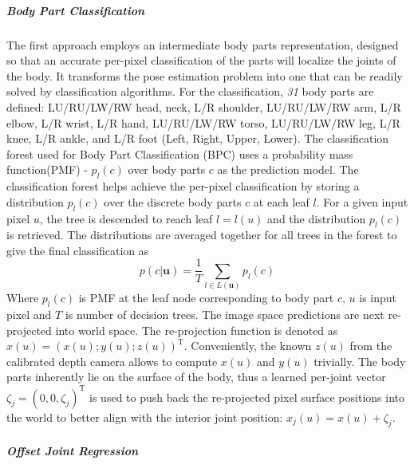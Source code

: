 \subparagraph{Body Part Classification} %
\label{subp:bpc} 
The first approach employs an intermediate body parts representation, designed so that an accurate per-pixel classification of the parts will localize the joints of the body. It transforms the pose estimation problem into one that can be readily solved by classification algorithms. For the classification, \emph{31} body parts are defined: LU/RU/LW/RW head, neck, L/R shoulder, LU/RU/LW/RW arm, L/R elbow, L/R wrist, L/R hand, LU/RU/LW/RW torso, LU/RU/LW/RW leg, L/R knee, L/R ankle, and L/R foot (Left, Right, Upper, Lower). The classification forest used for Body Part Classification (BPC) uses a probability mass function(PMF) - $p_l(c)$ over body parts $c$ as the prediction model. The classification forest helps achieve the per-pixel classification by storing a distribution $p_l(c)$ over the discrete body parts $c$ at each leaf $l$. For a given input pixel $u$, the tree is descended to reach leaf $l = l(u)$ and the distribution $p_l(c)$ is retrieved. The distributions are averaged together for all trees in the forest to give the final classification as
\begin{equation}
p(c\vert \textbf{u}) = \frac{1}{T}\sum_{l\in L(\textbf{u})} p_l(c)
\label{eqn:bpc_dist}
\end{equation}
Where $p_l(c)$ is PMF at the leaf node corresponding to body part $c$, $u$ is input pixel and $T$ is number of decision trees. The image space predictions are next re-projected into world space. The re-projection function is denoted as $x(u) = (x(u); y(u); z(u))^\text{T}$. Conveniently, the known $z(u)$ from the calibrated depth camera allows to compute $x(u)$ and $y(u)$ trivially. The body parts inherently lie on the surface of the body, thus a learned per-joint vector ${\zeta_j} = (0,0,\zeta_j)^\text{T}$ is used to push back the re-projected pixel surface positions into the world to better align with the interior joint position: $x_j(u) = x(u) + {\zeta_j}$. 
\subparagraph{Offset Joint Regression} %
\label{subp:ojr}  
